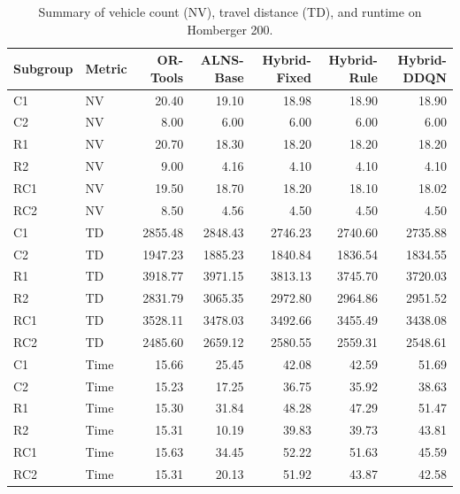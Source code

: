 \begin{table}[htbp]
\centering
\caption{Summary of vehicle count (NV), travel distance (TD), and runtime on Homberger 200.}
\label{tab:results_homberger_200}
\begin{tabular}{llrrrrr}
\hline
\textbf{Subgroup} & \textbf{Metric} & \textbf{OR-Tools} & \textbf{ALNS-Base} & \textbf{Hybrid-Fixed} & \textbf{Hybrid-Rule} & \textbf{Hybrid-DDQN} \\ \hline
C1 & NV & 20.40 & 19.10 & 18.98 & 18.90 & 18.90 \\
C2 & NV & 8.00 & 6.00 & 6.00 & 6.00 & 6.00 \\
R1 & NV & 20.70 & 18.30 & 18.20 & 18.20 & 18.20 \\
R2 & NV & 9.00 & 4.16 & 4.10 & 4.10 & 4.10 \\
RC1 & NV & 19.50 & 18.70 & 18.20 & 18.10 & 18.02 \\
RC2 & NV & 8.50 & 4.56 & 4.50 & 4.50 & 4.50 \\
C1 & TD & 2855.48 & 2848.43 & 2746.23 & 2740.60 & 2735.88 \\
C2 & TD & 1947.23 & 1885.23 & 1840.84 & 1836.54 & 1834.55 \\
R1 & TD & 3918.77 & 3971.15 & 3813.13 & 3745.70 & 3720.03 \\
R2 & TD & 2831.79 & 3065.35 & 2972.80 & 2964.86 & 2951.52 \\
RC1 & TD & 3528.11 & 3478.03 & 3492.66 & 3455.49 & 3438.08 \\
RC2 & TD & 2485.60 & 2659.12 & 2580.55 & 2559.31 & 2548.61 \\
C1 & Time & 15.66 & 25.45 & 42.08 & 42.59 & 51.69 \\
C2 & Time & 15.23 & 17.25 & 36.75 & 35.92 & 38.63 \\
R1 & Time & 15.30 & 31.84 & 48.28 & 47.29 & 51.47 \\
R2 & Time & 15.31 & 10.19 & 39.83 & 39.73 & 43.81 \\
RC1 & Time & 15.63 & 34.45 & 52.22 & 51.63 & 45.59 \\
RC2 & Time & 15.31 & 20.13 & 51.92 & 43.87 & 42.58 \\
\hline
\end{tabular}
\end{table}

